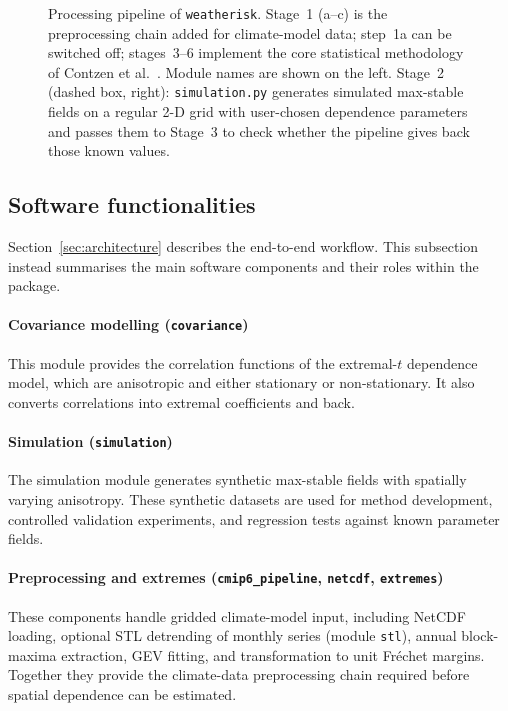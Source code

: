 \documentclass[preprint,12pt,a4paper]{elsarticle}
\newcommand{\rev}[1]{{#1}}
\newcommand{\revt}[1]{{#1}}
\begin{document}
\begin{figure}[ht]
\caption{\rev{Processing pipeline of \texttt{weatherisk}. Stage~1
  (a--c) is the preprocessing chain added for climate-model data;
  step~1a can be switched off;
  stages~3--6 implement the core statistical methodology of Contzen
  et al.~\cite{contzen2025}. Module names are shown on the left.\revt{ Stage~2
  (dashed box, right): \texttt{simulation.py} generates simulated
  max-stable fields on a regular 2-D grid with user-chosen dependence
  parameters and passes them to
  Stage~3 to check whether the pipeline gives back those known
  values.}}}
\label{fig:workflow}
\end{figure}

\subsection{Software functionalities}
\label{sec:functionalities}

Section~\ref{sec:architecture} describes the end-to-end workflow.
This subsection instead summarises the main software components and
their roles within the package.

\paragraph{Covariance modelling (\texttt{covariance})}
This module provides the correlation functions of the extremal-$t$
dependence model, which are anisotropic and either stationary or
non-stationary. It also converts correlations into extremal
coefficients and back.

\paragraph{Simulation (\texttt{simulation})}
The simulation module generates synthetic max-stable fields with
spatially varying anisotropy. These synthetic datasets are used for
method development, controlled validation experiments, and regression
tests against known parameter fields.

\paragraph{Preprocessing and extremes (\texttt{cmip6\_pipeline}, \texttt{netcdf}, \texttt{extremes})}
These components handle gridded climate-model input, including NetCDF
loading, optional STL detrending of monthly series (module \texttt{stl}), annual block-maxima
extraction, GEV fitting, and transformation to unit Fr\'{e}chet
margins. Together they provide the climate-data preprocessing chain
required before spatial dependence can be estimated.
\end{document}
